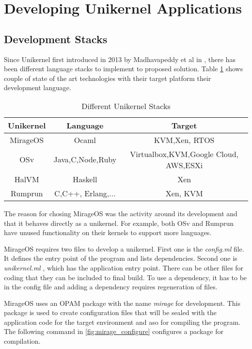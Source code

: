 
\section{Developing Unikernel Applications}
\subsection{Development Stacks}

Since Unikernel first introduced in 2013 by Madhavapeddy et al in \cite{library-operating-system}, there has been different language stacks to implement to proposed solution. Table \ref{tab:stacks} shows couple of state of the art technologies with their target platform their development language.

\begin{table}[htpb]
    \caption[Different Unikernel Stacks]{Different Unikernel Stacks}\label{tab:stacks}
    \centering
    \begin{tabular}{ |c |c |c| }
      \toprule
        Unikernel & Language & Target \\
      \midrule
        MirageOS & Ocaml & KVM,Xen, RTOS \\
        \hline
        OSv & Java,C,Node,Ruby & Virtualbox,KVM,Google Cloud, AWS,ESXi \\
        \hline
        HalVM & Haskell & Xen \\
      \hline
        Rumprun & C,C++, Erlang,... &  Xen, KVM \\
      \bottomrule
    \end{tabular}
  \end{table}

The reason for chosing MirageOS was the activity around its development and that it behaves directly as a unikernel. For example, both OSv and Rumprun have unused functionality on their kernels to support more languages.

MirageOS requires two files to develop a unikernel. First one is the \textit{config.ml} file. It defines the entry point of the program and lists dependencies. Second one is \textit{unikernel.ml} , which has the application entry point. There can be other files for coding that they can be included to final build. To use a dependency, it has to be in the config file and adding a dependency requires regeneration of files.

MirageOS uses an OPAM package with the name \textit{mirage} \cite{opammirage} for development. This package is used to create configuration files that will be sealed with the application code for the target environment and aso for compiling the program. The following command in \ref{fig:mirage_configure} configures a package for compilation. 

